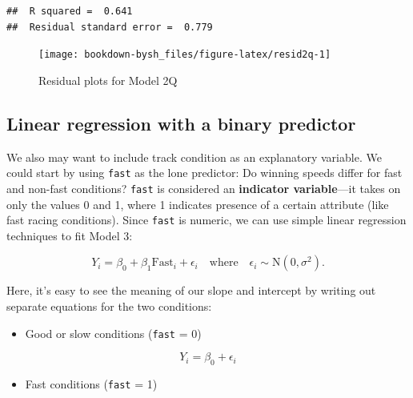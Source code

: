 \documentclass[
]{krantz}
\providecommand{\tightlist}{%
  \setlength{\itemsep}{0pt}\setlength{\parskip}{0pt}}
\begin{document}
\begin{verbatim}
##  R squared =  0.641 
##  Residual standard error =  0.779
\end{verbatim}

\begin{figure}

{\centering \texttt{[image: bookdown-bysh\_files/figure-latex/resid2q-1]} 

}

\caption{Residual plots for Model 2Q}\label{fig:resid2q}
\end{figure}

\hypertarget{linear-regression-with-a-binary-predictor}{%
\subsection{Linear regression with a binary predictor}\label{linear-regression-with-a-binary-predictor}}

We also may want to include track condition as an explanatory variable. We could start by using \texttt{fast} as the lone predictor: Do winning speeds differ for fast and non-fast conditions? \texttt{fast} is considered an \textbf{indicator variable}---it takes on only the values 0 and 1,  where 1 indicates presence of a certain attribute (like fast racing conditions). Since \texttt{fast} is numeric, we can use simple linear regression techniques to fit Model 3:

\begin{equation}
Y_{i}=\beta_{0}+\beta_{1}\textrm{Fast}_{i}+\epsilon_{i}\quad \textrm{where}\quad \epsilon_{i}\sim \textrm{N}(0,\sigma^2).
\label{eq:model3}
\end{equation}

Here, it's easy to see the meaning of our slope and intercept by writing out separate equations for the two conditions:

\begin{itemize}
\tightlist
\item
  Good or slow conditions (\texttt{fast} = 0)
\end{itemize}

\begin{equation*}
Y_{i} = \beta_{0}+\epsilon_{i}
\end{equation*}

\begin{itemize}
\tightlist
\item
  Fast conditions (\texttt{fast} = 1)
\end{itemize}
\end{document}
